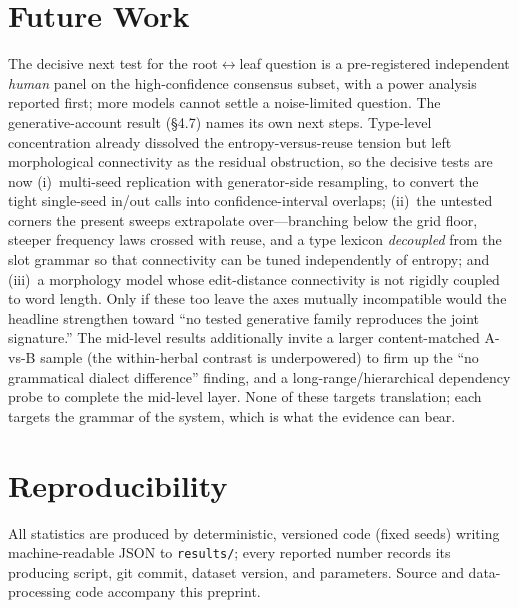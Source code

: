 \documentclass[11pt]{article}
\begin{document}
\section{Future Work}
The decisive next test for the root$\leftrightarrow$leaf question is a pre-registered
independent \emph{human} panel on the high-confidence consensus subset, with a power
analysis reported first; more models cannot settle a noise-limited question. The
generative-account result (\S4.7) names its own next steps. Type-level concentration
already dissolved the entropy-versus-reuse tension but left morphological connectivity as
the residual obstruction, so the decisive tests are now (i)~multi-seed replication with
generator-side resampling, to convert the tight single-seed in/out calls into
confidence-interval overlaps; (ii)~the untested corners the present sweeps extrapolate
over---branching below the grid floor, steeper frequency laws crossed with reuse, and a
type lexicon \emph{decoupled} from the slot grammar so that connectivity can be tuned
independently of entropy; and (iii)~a morphology model whose edit-distance connectivity is
not rigidly coupled to word length. Only if these too leave the axes mutually incompatible
would the headline strengthen toward ``no tested generative family reproduces the joint
signature.'' The mid-level results additionally
invite a larger content-matched A-vs-B sample (the within-herbal contrast is
underpowered) to firm up the ``no grammatical dialect difference'' finding, and a
long-range/hierarchical dependency probe to complete the mid-level layer. None of these
targets translation; each targets the grammar of the system, which is what the evidence
can bear.

\section*{Reproducibility}
All statistics are produced by deterministic, versioned code (fixed seeds) writing
machine-readable JSON to \texttt{results/}; every reported number records its
producing script, git commit, dataset version, and parameters. Source and
data-processing code accompany this preprint.



\end{document}
